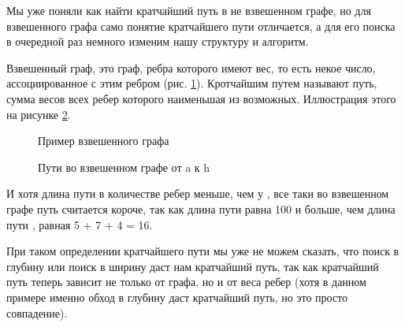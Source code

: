 \documentclass[../../article.tex]{subfiles}
\begin{document}
{Мы уже поняли как найти кратчайший путь в не взвешенном графе, но для взвешенного графа само понятие кратчайшего пути отличается, а для его поиска в очередной раз немного изменим нашу структуру и алгоритм.}

Взвешенный граф, это граф, ребра которого имеют вес, то есть некое число, ассоциированное с этим ребром (рис. \ref{fig:weightedGraphExample}). Кротчайшим путем называют путь, сумма весов всех ребер которого наименьшая из возможных. Иллюстрация этого на рисунке \ref{fig:compareWeightedPaths}.

\begin{figure}
    \caption{Пример взвешенного графа}
    \label{fig:weightedGraphExample}
\end{figure}

\begin{figure}
    \caption{Пути во взвешенном графе от {\firacodebold a} к {\firacodebold h}}
    \label{fig:compareWeightedPaths}
\end{figure}

И хотя длина пути {\firacodebold [a, h]} в количестве ребер меньше, чем у {\firacodebold [a, f, g, h]}, все таки во взвешенном графе путь {\firacodebold [a, f, g, h]} считается короче, так как длина пути {\firacodebold [a, h]} равна 100 и больше, чем длина пути {\firacodebold [a, f, g, h]}, равная 5 + 7 + 4 = 16.

При таком определении кратчайшего пути мы уже не можем сказать, что поиск в глубину или поиск в ширину даст нам кратчайший путь, так как кратчайший путь теперь зависит не только от графа, но и от веса ребер (хотя в данном примере именно обход в глубину даст кратчайший путь, но это просто совпадение).
\end{document}
